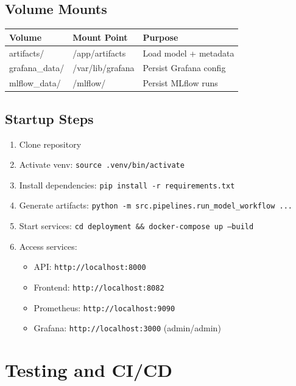 \documentclass[12pt,a4paper]{article}
\newcommand{\code}[1]{\texttt{#1}}
\begin{document}
\subsection{Volume Mounts}

\begin{table}[H]
\centering
\small
\begin{tabular}{|l|l|l|}
\hline
\textbf{Volume} & \textbf{Mount Point} & \textbf{Purpose} \\
\hline
artifacts/ & /app/artifacts & Load model + metadata \\
grafana\_data/ & /var/lib/grafana & Persist Grafana config \\
mlflow\_data/ & /mlflow/ & Persist MLflow runs \\
\hline
\end{tabular}
\end{table}

\subsection{Startup Steps}

\begin{enumerate}
    \item Clone repository
    \item Activate venv: \code{source .venv/bin/activate}
    \item Install dependencies: \code{pip install -r requirements.txt}
    \item Generate artifacts: \code{python -m src.pipelines.run\_model\_workflow ...}
    \item Start services: \code{cd deployment \&\& docker-compose up --build}
    \item Access services:
    \begin{itemize}
        \item API: \code{http://localhost:8000}
        \item Frontend: \code{http://localhost:8082}
        \item Prometheus: \code{http://localhost:9090}
        \item Grafana: \code{http://localhost:3000} (admin/admin)
    \end{itemize}
\end{enumerate}

\section{Testing and CI/CD}
\end{document}
